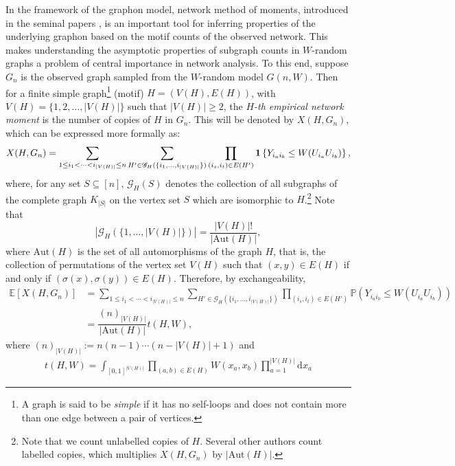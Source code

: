 \documentclass[11pt,reqno]{amsart}
\numberwithin{equation}{section}
\newcommand{\one}{{\bf 1}}
\renewcommand{\P}{\mathbb{P}}
\theoremstyle{definition}
\begin{document}
In the framework of the graphon model, network method of moments, introduced in the seminal papers \cite{bickel2011method,borgs2010moments}, is an important tool for inferring properties of the underlying graphon based on the motif counts of the observed network. 
This makes understanding the asymptotic properties of subgraph counts in $W$-random graphs a problem of central importance in network analysis. To this end, suppose $G_n$ is the observed graph sampled from the $W$-random model $G(n, W)$. Then for a finite simple graph\footnote{ A graph is said to be {\it simple} if it has no self-loops and does not contain more than one edge between a pair of vertices. } (motif) $H=(V(H), E(H))$, with $V(H) = \{1,2, \ldots, |V(H)|\}$ such that $|V(H)| \geq 2$, the {\it $H$-th empirical network moment} is the number of copies of $H$ in $G_n$. This will be denoted by $X(H, G_n)$, which can be expressed more formally as: 
\begin{align}\label{eq:XHW}
X(H, G_n)=\sum_{1\leq i_{1}<\cdots<i_{|V(H)|}\leq n}\sum_{H'\in \mathscr{G}_H(\{i_{1},\ldots, i_{|V(H)|} \}) } \prod_{(i_{s}, i_{t}) \in E(H')}\one\left\{Y_{i_{a}i_{b}}\leq W(U_{i_{a}}U_{i_{b}})\right\}, 
\end{align}
where, for any set $S \subseteq [n]$, $\mathscr G_H(S)$ denotes the collection of all subgraphs of the complete graph $K_{|S|}$ on the vertex set $S$ which are isomorphic to $H$.\footnote{Note that we count unlabelled copies of $H$. Several
other authors count labelled copies, which multiplies $X(H, G_n)$ by $|\text{Aut}(H)|$.} Note that
$$| \mathscr{G}_H(\{1,\ldots, |V(H)| \}) | = \dfrac{|V(H)|!}{|\text{Aut}(H)|}, $$
where $\text{Aut}(H)$ is the set of all automorphisms of the graph $H$, that is, the collection of permutations of the vertex set $V (H)$ such that $(x, y) \in E(H)$ if and only if $(\sigma(x), \sigma(y)) \in E(H)$. Therefore, by exchangeability, 
\begin{align}\label{eq:EXHW}
\mathbb E[X(H, G_n)] & =\sum_{1\leq i_{1}<\cdots<i_{|V(H)|}\leq n}\sum_{H'\in \mathscr{G}_H(\{i_{1},\ldots, i_{|V(H)|} \}) } \prod_{(i_{s}, i_{t}) \in E(H')} \P(Y_{i_{a}i_{b}}\leq W(U_{i_{a}}U_{i_{b}}) ) \nonumber \\ 
&= \dfrac{(n)_{|V(H)|}}{|\text{Aut}(H)|}t(H,W) , 
\end{align}
where $(n)_{|V(H)|}:=n(n-1)\cdots (n-|V(H)|+1)$ and 
\begin{align}\label{eq:tHW}
t(H,W)=\int_{[0,1]^{|V(H)|}}\prod_{(a, b) \in E(H)}W(x_{a},x_{b})\prod_{a=1}^{|V(H)|}\mathrm{d} x_{a}  
\end{align}
\end{document}
